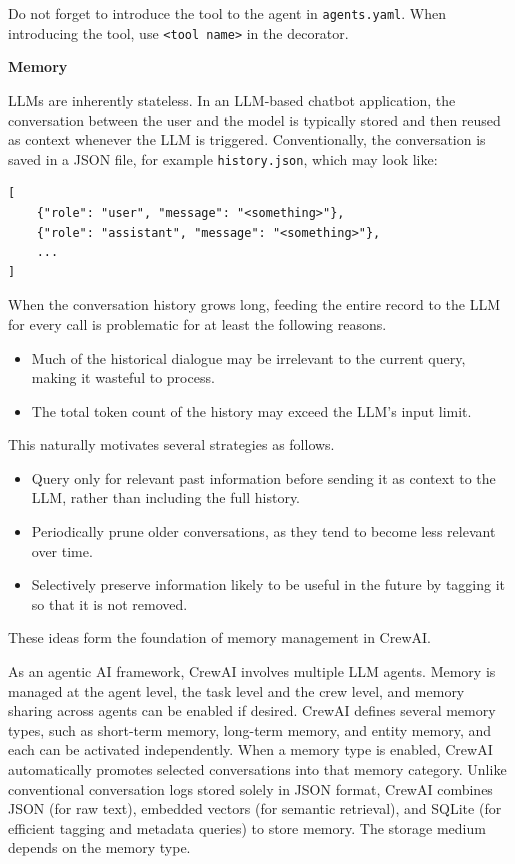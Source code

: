 Do not forget to introduce the tool to the agent in \verb|agents.yaml|. When introducing the tool, use \texttt{<tool name>} in the decorator.

\vspace{0.1in}
\noindent \textbf{Memory}
\vspace{0.1in}

LLMs are inherently stateless. In an LLM-based chatbot application, the conversation between the user and the model is typically stored and then reused as context whenever the LLM is triggered. Conventionally, the conversation is saved in a JSON file, for example \verb|history.json|, which may look like:
\begin{lstlisting}
[
	{"role": "user", "message": "<something>"},
	{"role": "assistant", "message": "<something>"},
	...
]
\end{lstlisting}

When the conversation history grows long, feeding the entire record to the LLM for every call is problematic for at least the following reasons.
\begin{itemize}
	\item Much of the historical dialogue may be irrelevant to the current query, making it wasteful to process.
	\item The total token count of the history may exceed the LLM’s input limit.
\end{itemize}
This naturally motivates several strategies as follows.
\begin{itemize}
	\item Query only for relevant past information before sending it as context to the LLM, rather than including the full history.
	\item Periodically prune older conversations, as they tend to become less relevant over time.
	\item Selectively preserve information likely to be useful in the future by tagging it so that it is not removed.
\end{itemize}
These ideas form the foundation of memory management in CrewAI.

As an agentic AI framework, CrewAI involves multiple LLM agents. Memory is managed at the agent level, the task level and the crew level, and memory sharing across agents can be enabled if desired. CrewAI defines several memory types, such as short-term memory, long-term memory, and entity memory, and each can be activated independently. When a memory type is enabled, CrewAI automatically promotes selected conversations into that memory category. Unlike conventional conversation logs stored solely in JSON format, CrewAI combines JSON (for raw text), embedded vectors (for semantic retrieval), and SQLite (for efficient tagging and metadata queries) to store memory. The storage medium depends on the memory type.

